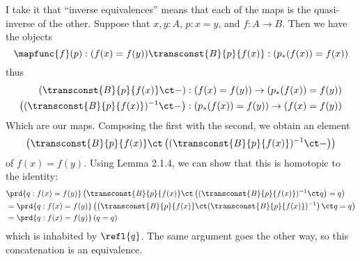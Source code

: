  \soln 
I take it that ``inverse equivalences'' means that each of the maps is the
quasi-inverse of the other.  Suppose that $x, y : A$, $p : x = y$, and $f : A
\to B$.  Then we have the objects 
\[
  \mapfunc{f}(p) : (f(x) = f(y)) \\
  \transconst{B}{p}{f(x)} : (p_{*}(f(x)) = f(x))
\]
thus
\begin{align*}
  \left(\transconst{B}{p}{f(x)} \ct -\right)
  &:
  (f(x)=f(y))
  \to
  (p_{*}(f(x)) = f(y))
  \\
  \left((\transconst{B}{p}{f(x)})^{-1} \ct -\right)
  &:
  (p_{*}(f(x))=f(y))
  \to
  (f(x) = f(y))
\end{align*}
Which are our maps.  Composing the first with the second, we obtain an element
\[
  \left(\transconst{B}{p}{f(x)} \ct
  \left((\transconst{B}{p}{f(x)})^{-1} \ct -\right)\right)
\]
of $f(x) = f(y)$.  Using Lemma 2.1.4, we can show that this is homotopic to the
identity:
\begin{align*}
  &\prd{q:f(x)=f(y)}
  \left(
  \transconst{B}{p}{f(x)} \ct
  \left((\transconst{B}{p}{f(x)})^{-1} \ct q\right)
  =
  q\right)
  \\&= 
  \prd{q:f(x)=f(y)}
  \left(
  \left(\transconst{B}{p}{f(x)} \ct
  (\transconst{B}{p}{f(x)})^{-1}\right) \ct q
  =
  q\right)
  \\&= 
  \prd{q:f(x)=f(y)}
  \left(
  q
  =
  q\right)
\end{align*}
which is inhabited by $\refl{q}$.  The same argument goes the other way, so
this concatenation is an equivalence.
